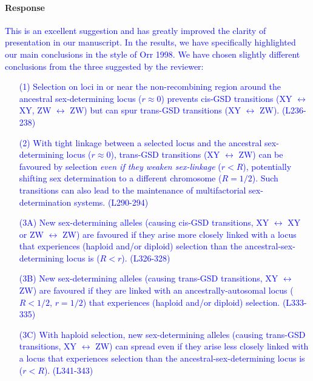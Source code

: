 \documentclass[10pt,letterpaper]{article}
\begin{document}
\noindent\paragraph{Response}
\textcolor{blue}{
This is an excellent suggestion and has greatly improved the clarity of presentation in our manuscript. In the results, we have specifically highlighted our main conclusions in the style of Orr 1998. We have chosen slightly different conclusions from the three suggested by the reviewer: 
\begin{enumerate}
\item[(1)] Selection on loci in or near the non-recombining region around the ancestral sex-determining locus ($r\approx0$) prevents cis-GSD transitions (XY $\leftrightarrow$ XY, ZW $\leftrightarrow$ ZW) but can spur trans-GSD transitions (XY $\leftrightarrow$ ZW). (L236-238)
\item[(2)] With tight linkage between a selected locus and the ancestral sex-determining locus ($r\approx0$), trans-GSD transitions (XY $\leftrightarrow$ ZW) can be favoured by selection \textit{even if they weaken sex-linkage} ($r<R$), potentially shifting sex determination to a different chromosome ($R=1/2$). 
Such transitions can also lead to the maintenance of multifactorial sex-determination systems. (L290-294)
\item[(3A)] New sex-determining alleles (causing cis-GSD transitions, XY $\leftrightarrow$ XY or ZW $\leftrightarrow$ ZW) are favoured if they arise more closely linked with a locus that experiences (haploid and/or diploid) selection than the ancestral-sex-determining locus is ($R<r$). (L326-328)
\item[(3B)] New sex-determining alleles (causing trans-GSD transitions, XY $\leftrightarrow$ ZW) are favoured if they are linked with an ancestrally-autosomal locus ($R<1/2$, $r=1/2$) that experiences (haploid and/or diploid) selection. (L333-335)
\item[(3C)] With haploid selection, new sex-determining alleles (causing trans-GSD transitions, XY $\leftrightarrow$ ZW) can spread even if they arise less closely linked with a locus that experiences selection than the ancestral-sex-determining locus is ($r<R$). (L341-343)

\end{enumerate}}
\end{document}
